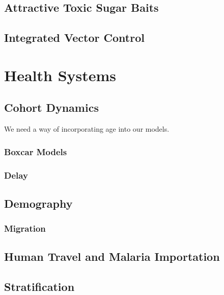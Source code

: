 \documentclass[
]{book}
\begin{document}
\chapter{Attractive Toxic Sugar Baits}\label{attractive-toxic-sugar-baits}

\chapter{Integrated Vector Control}\label{integrated-vector-control-1}

\part{Health Systems}\label{part-health-systems}

\chapter{Cohort Dynamics}\label{cohort-dynamics-1}

We need a way of incorporating age into our models.

\section{Boxcar Models}\label{boxcar-models}

\section{Delay}\label{delay}

\chapter{Demography}\label{demography}

\section{Migration}\label{migration-1}

\chapter{Human Travel and Malaria Importation}\label{human-travel-and-malaria-importation}

\chapter{Stratification}\label{stratification}
\end{document}
